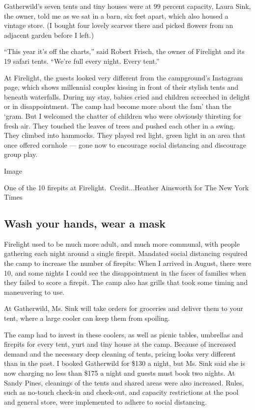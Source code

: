 Gatherwild's seven tents and tiny houses were at 99 percent capacity,
Laura Sink, the owner, told me as we sat in a barn, six feet apart,
which also housed a vintage store. (I bought four lovely scarves there
and picked flowers from an adjacent garden before I left.)

``This year it's off the charts,'' said Robert Frisch, the owner of
Firelight and its 19 safari tents. ``We're full every night. Every
tent.''

At Firelight, the guests looked very different from the campground's
Instagram page, which shows millennial couples kissing in front of their
stylish tents and beneath waterfalls. During my stay, babies cried and
children screeched in delight or in disappointment. The camp had become
more about the fam' than the `gram. But I welcomed the chatter of
children who were obviously thirsting for fresh air. They touched the
leaves of trees and pushed each other in a swing. They climbed into
hammocks. They played red light, green light in an area that once
offered cornhole --- gone now to encourage social distancing and
discourage group play.

Image

One of the 10 firepits at Firelight.~Credit...Heather Ainsworth for The
New York Times

\hypertarget{wash-your-hands-wear-a-mask}{%
\subsection{Wash your hands, wear a
mask}\label{wash-your-hands-wear-a-mask}}

Firelight used to be much more adult, and much more communal, with
people gathering each night around a single firepit. Mandated social
distancing required the camp to increase the number of firepits: When I
arrived in August, there were 10, and some nights I could see the
disappointment in the faces of families when they failed to score a
firepit. The camp also has grills that took some timing and maneuvering
to use.

At Gatherwild, Ms. Sink will take orders for groceries and deliver them
to your tent, where a large cooler can keep them from spoiling.

The camp had to invest in these coolers, as well as picnic tables,
umbrellas and firepits for every tent, yurt and tiny house at the camp.
Because of increased demand and the necessary deep cleaning of tents,
pricing looks very different than in the past. I booked Gatherwild for
\$130 a night, but Ms. Sink said she is now charging no less than \$175
a night and guests must book two nights. At Sandy Pines, cleanings of
the tents and shared areas were also increased. Rules, such as no-touch
check-in and check-out, and capacity restrictions at the pool and
general store, were implemented to adhere to social distancing.

